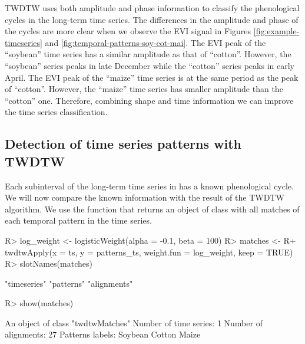 \documentclass[article,shortnames]{jss}
\begin{document}
TWDTW uses both amplitude and phase information to classify the
phenological cycles in the long-term time series. The differences in the
amplitude and phase of the cycles are more clear when we observe the EVI
signal in Figures \ref{fig:example-timeseries} and
\ref{fig:temporal-patterns-soy-cot-mai}. The EVI peak of the ``soybean''
time series has a similar amplitude as that of ``cotton''. However, the
``soybean'' series peaks in late December while the ``cotton'' series
peaks in early April. The EVI peak of the ``maize'' time series is at
the same period as the peak of ``cotton''. However, the ``maize'' time
series has smaller amplitude than the ``cotton'' one. Therefore,
combining shape and time information we can improve the time series
classification. \goodbreak

\hypertarget{detection-of-time-series-patterns-with-twdtw}{%
\subsection{Detection of time series patterns with
TWDTW}\label{detection-of-time-series-patterns-with-twdtw}}

Each subinterval of the long-term time series in  has a known
phenological cycle. We will now compare the known information with the
result of the TWDTW algorithm. We use the function 
that returns an  object of class  with
all matches of each temporal pattern in the time series.

\begin{CodeChunk}

\begin{CodeInput}
R> log_weight <- logisticWeight(alpha = -0.1, beta = 100)
R> matches <- 
R+   twdtwApply(x = ts, y = patterns_ts, weight.fun = log_weight, keep = TRUE)
R> slotNames(matches)
\end{CodeInput}

\begin{CodeOutput}
[1] "timeseries" "patterns"   "alignments"
\end{CodeOutput}

\begin{CodeInput}
R> show(matches)
\end{CodeInput}

\begin{CodeOutput}
An object of class "twdtwMatches"
Number of time series: 1 
Number of alignments: 27 
Patterns labels: Soybean Cotton Maize 
\end{CodeOutput}
\end{CodeChunk}
\end{document}
